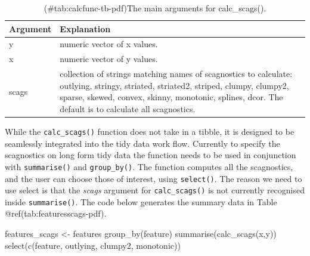 \begin{Schunk}
\begin{table}

\caption{(\#tab:calcfunc-tb-pdf)The main arguments for calc\_scags().}
\centering
\begin{tabular}[t]{l>{\raggedright\arraybackslash}p{12cm}}
\toprule
Argument & Explanation\\
\midrule
y & numeric vector of x values.\\
x & numeric vector of y values.\\
scags & collection of strings matching names of scagnostics to calculate: outlying, stringy, striated, striated2, striped, clumpy, clumpy2, sparse, skewed, convex, skinny, monotonic, splines, dcor. The default is to calculate all scagnostics.\\
\bottomrule
\end{tabular}
\end{table}

\end{Schunk}

While the \texttt{calc\_scags()} function does not take in a tibble, it
is designed to be seamlessly integrated into the tidy data work flow.
Currently to specify the scagnostics on long form tidy data the function
needs to be used in conjunction with \texttt{summarise()} and
\texttt{group\_by()}. The function computes all the scagnostics, and the
user can choose those of interest, using \texttt{select()}. The reason
we need to use select is that the \emph{scags} argument for
\texttt{calc\_scags()} is not currently recognised inside
\texttt{summarise()}. The code below generates the summary data in Table
@ref(tab:featuresscags-pdf).

\begin{Schunk}
\begin{Sinput}
features_scags <- features %
  group_by(feature) %
  summarise(calc_scags(x,y)) %
  select(c(feature, outlying, clumpy2, monotonic))
\end{Sinput}
\end{Schunk}

